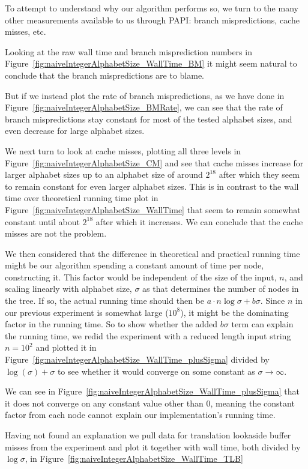 To attempt to understand why our algorithm performs so, we turn to the many other measurements available to us through PAPI: branch mispredictions, cache misses, etc.

Looking at the raw wall time and branch misprediction numbers in Figure~\ref{fig:naiveIntegerAlphabetSize_WallTime_BM} it might seem natural to conclude that the branch mispredictions are to blame.

But if we instead plot the rate of branch mispredictions, as we have done in Figure~\ref{fig:naiveIntegerAlphabetSize_BMRate}, we can see that the rate of branch mispredictions stay constant for most of the tested alphabet sizes, and even decrease for large alphabet sizes.

We next turn to look at cache misses, plotting all three levels in Figure~\ref{fig:naiveIntegerAlphabetSize_CM} and see that cache misses increase for larger alphabet sizes up to an alphabet size of around $2^{18}$ after which they seem to remain constant for even larger alphabet sizes.
This is in contrast to the wall time over theoretical running time plot in Figure~\ref{fig:naiveIntegerAlphabetSize_WallTime} that seem to remain somewhat constant until about $2^{18}$ after which it increases.
We can conclude that the cache misses are not the problem.

We then considered that the difference in theoretical and practical running time might be our algorithm spending a constant amount of time per node, constructing it. This factor would be independent of the size of the input, $n$, and scaling linearly with alphabet size, $\sigma$ as that determines the number of nodes in the tree.
If so, the actual running time should then be $a \cdot n \log\sigma + b \sigma$.
Since $n$ in our previous experiment is somewhat large ($10^8$), it might be the dominating factor in the running time.
So to show whether the added $b \sigma$ term can explain the running time, we redid the experiment with a reduced length input string $n = 10^2$ and plotted it in Figure~\ref{fig:naiveIntegerAlphabetSize_WallTime_plusSigma} divided by $\log(\sigma) + \sigma$ to see whether it would converge on some constant as $\sigma \rightarrow \infty$.

We can see in Figure~\ref{fig:naiveIntegerAlphabetSize_WallTime_plusSigma} that it does not converge on any constant value other than 0, meaning the constant factor from each node cannot explain our implementation's running time.

Having not found an explanation we pull data for translation lookaside buffer misses from the experiment and plot it together with wall time, both divided by $\log \sigma$, in Figure~\ref{fig:naiveIntegerAlphabetSize_WallTime_TLB}

